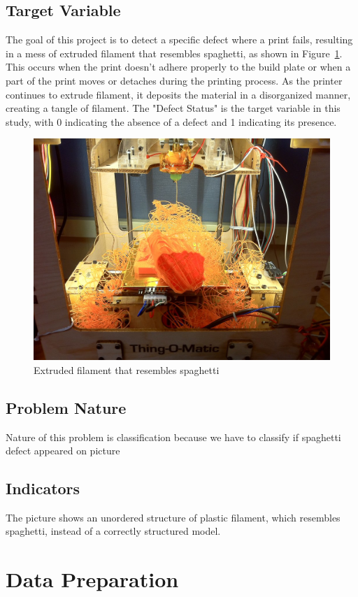 \documentclass[12pt,a4paper]{article}
\begin{document}
\subsection{Target Variable}
The goal of this project is to detect a specific defect where a print fails, resulting in a mess of extruded filament that resembles spaghetti, as shown in Figure~\ref{fig:spaghetti3D}. This occurs when the print doesn't adhere properly to the build plate or when a part of the print moves or detaches during the printing process. As the printer continues to extrude filament, it deposits the material in a disorganized manner, creating a tangle of filament. The "Defect Status" is the target variable in this study, with 0 indicating the absence of a defect and 1 indicating its presence.
\begin{figure}[h]
    \centering
    \includegraphics[width=0.8\linewidth]{spaghetti3D.jpg}
    \caption{Extruded filament that resembles spaghetti}
    \label{fig:spaghetti3D}
    \end{figure}

\subsection{Problem Nature}
Nature of this problem is classification because we have to classify if spaghetti defect appeared on picture
\subsection{Indicators}
The picture shows an unordered structure of plastic filament, which resembles spaghetti, instead of a correctly structured model.

\section{Data Preparation}
\end{document}
